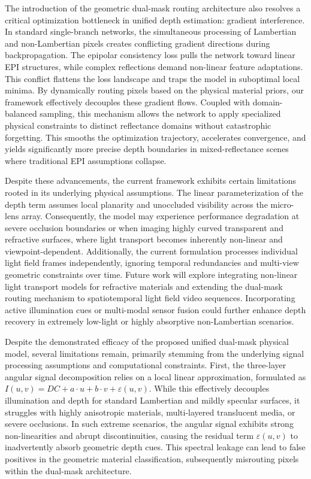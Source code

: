 \documentclass[lettersize,journal]{IEEEtran}
\begin{document}
The introduction of the geometric dual-mask routing architecture also resolves a critical optimization bottleneck in unified depth estimation: gradient interference. In standard single-branch networks, the simultaneous processing of Lambertian and non-Lambertian pixels creates conflicting gradient directions during backpropagation. The epipolar consistency loss pulls the network toward linear EPI structures, while complex reflections demand non-linear feature adaptations. This conflict flattens the loss landscape and traps the model in suboptimal local minima. By dynamically routing pixels based on the physical material priors, our framework effectively decouples these gradient flows. Coupled with domain-balanced sampling, this mechanism allows the network to apply specialized physical constraints to distinct reflectance domains without catastrophic forgetting. This smooths the optimization trajectory, accelerates convergence, and yields significantly more precise depth boundaries in mixed-reflectance scenes where traditional EPI assumptions collapse.

Despite these advancements, the current framework exhibits certain limitations rooted in its underlying physical assumptions. The linear parameterization of the depth term assumes local planarity and unoccluded visibility across the micro-lens array. Consequently, the model may experience performance degradation at severe occlusion boundaries or when imaging highly curved transparent and refractive surfaces, where light transport becomes inherently non-linear and viewpoint-dependent. Additionally, the current formulation processes individual light field frames independently, ignoring temporal redundancies and multi-view geometric constraints over time. Future work will explore integrating non-linear light transport models for refractive materials and extending the dual-mask routing mechanism to spatiotemporal light field video sequences. Incorporating active illumination cues or multi-modal sensor fusion could further enhance depth recovery in extremely low-light or highly absorptive non-Lambertian scenarios.

Despite the demonstrated efficacy of the proposed unified dual-mask physical model, several limitations remain, primarily stemming from the underlying signal processing assumptions and computational constraints. First, the three-layer angular signal decomposition relies on a local linear approximation, formulated as $I(u,v) = DC + a\cdot u + b\cdot v + \varepsilon(u,v)$. While this effectively decouples illumination and depth for standard Lambertian and mildly specular surfaces, it struggles with highly anisotropic materials, multi-layered translucent media, or severe occlusions. In such extreme scenarios, the angular signal exhibits strong non-linearities and abrupt discontinuities, causing the residual term $\varepsilon(u,v)$ to inadvertently absorb geometric depth cues. This spectral leakage can lead to false positives in the geometric material classification, subsequently misrouting pixels within the dual-mask architecture.
\end{document}

